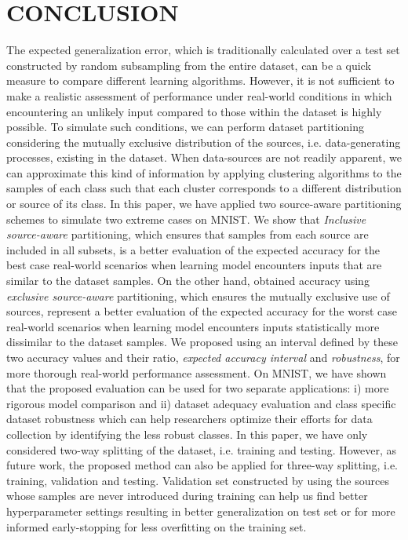 \documentclass[letterpaper]{article}
\begin{document}
\section{CONCLUSION}

The expected generalization error, which is traditionally calculated over a test set constructed by random subsampling from the entire dataset, can be a quick measure to compare different learning algorithms. However, it is not sufficient to make a realistic assessment of performance under real-world conditions in which encountering an unlikely input compared to those within the dataset is highly possible. To simulate such conditions, we can perform dataset partitioning considering the mutually exclusive distribution of the sources, i.e. data-generating processes, existing in the dataset. When data-sources are not readily apparent, we can approximate this kind of information by applying clustering algorithms to the samples of each class such that each cluster corresponds to a different distribution or source of its class. In this paper, we have applied two source-aware partitioning schemes to simulate two extreme cases on MNIST. We show that \textit{Inclusive source-aware} partitioning, which ensures that samples from each source are included in all subsets, is a better evaluation of the expected accuracy for the best case real-world scenarios when learning model encounters inputs that are similar to the dataset samples. On the other hand, obtained accuracy using \textit{exclusive source-aware} partitioning, which ensures the mutually exclusive use of sources, represent a better evaluation of the expected accuracy for the worst case real-world scenarios when learning model encounters inputs statistically more dissimilar to the dataset samples. We proposed using an interval defined by these two accuracy values and their ratio, \textit{expected accuracy interval} and \textit{robustness}, for more thorough real-world performance assessment. On MNIST, we have shown that the proposed evaluation can be used for two separate applications: i) more rigorous model comparison and ii) dataset adequacy evaluation and class specific dataset robustness which can help researchers optimize their efforts for data collection by identifying the less robust classes. In this paper, we have only considered two-way splitting of the dataset, i.e. training and testing. However, as future work, the proposed method can also be applied for three-way splitting, i.e. training, validation and testing. Validation set constructed by using the sources whose samples are never introduced during training can help us find better hyperparameter settings resulting in better generalization on test set or for more informed early-stopping for less overfitting on the training set. 




\end{document}
